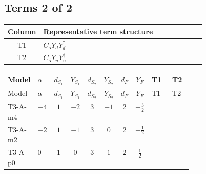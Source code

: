 \documentclass[8pt]{article}
\begin{document}
\begin{landscape}
\subsection*{Terms 2 of 2}
\begin{center}
\begin{tabular}{@{}c >{\raggedright\arraybackslash}p{0.82\linewidth}@{}}
\toprule
Column & Representative term structure \\
\midrule
T1 & \(\displaystyle C_{5} Y_d Y_d^\dagger\) \\
\midrule
T2 & \(\displaystyle C_{5} Y_u Y_u^\dagger\) \\
\midrule
\bottomrule
\end{tabular}
\end{center}
\smallskip
\tiny
\begin{longtable}{@{}llcccccc >{\raggedright\arraybackslash}p{0.21\linewidth} >{\raggedright\arraybackslash}p{0.21\linewidth}@{}}
\toprule
Model & $\alpha$ & $d_{S_1}$ & $Y_{S_1}$ & $d_{S_2}$ & $Y_{S_2}$ & $d_F$ & $Y_F$ & T1 & T2 \\
\midrule
\endfirsthead
\toprule
Model & $\alpha$ & $d_{S_1}$ & $Y_{S_1}$ & $d_{S_2}$ & $Y_{S_2}$ & $d_F$ & $Y_F$ & T1 & T2 \\
\midrule
\endhead
T3-A-m4 & $-4$ & $1$ & $-2$ & $3$ & $-1$ & $2$ & $-\frac{3}{2}$ & \scriptsize\adjustbox{max width=\linewidth}{$\begin{gathered} 6 C_{5} Y_d Y_d^\dagger\end{gathered}$} & \scriptsize\adjustbox{max width=\linewidth}{$\begin{gathered} 6 C_{5} Y_u Y_u^\dagger\end{gathered}$} \\
\midrule
T3-A-m2 & $-2$ & $1$ & $-1$ & $3$ & $0$ & $2$ & $-\frac{1}{2}$ & \scriptsize\adjustbox{max width=\linewidth}{$\begin{gathered} 6 C_{5} Y_d Y_d^\dagger\end{gathered}$} & \scriptsize\adjustbox{max width=\linewidth}{$\begin{gathered} 6 C_{5} Y_u Y_u^\dagger\end{gathered}$} \\
\midrule
T3-A-p0 & $0$ & $1$ & $0$ & $3$ & $1$ & $2$ & $\frac{1}{2}$ & \scriptsize\adjustbox{max width=\linewidth}{$\begin{gathered} 6 C_{5} Y_d Y_d^\dagger\end{gathered}$} & \scriptsize\adjustbox{max width=\linewidth}{$\begin{gathered} 6 C_{5} Y_u Y_u^\dagger\end{gathered}$} \\

\end{longtable}
\end{landscape}
\end{document}
